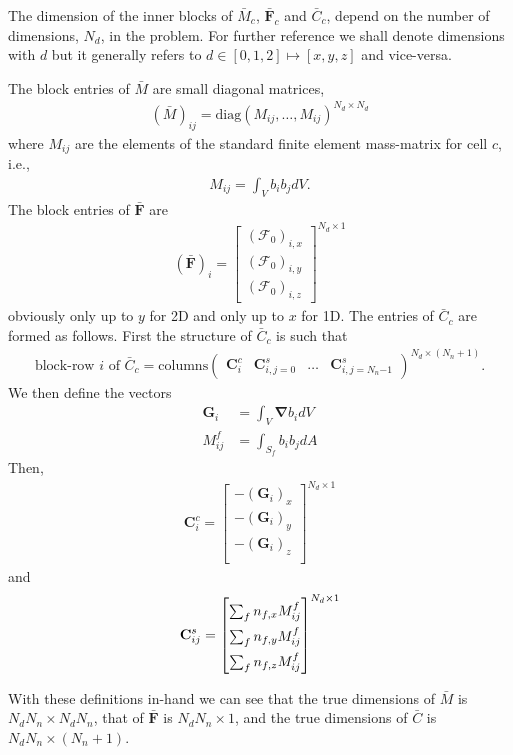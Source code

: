 \documentclass[10pt,letterpaper,notitlepage]{article}
\numberwithin{equation}{section}
\newcommand{\bnabla}{\boldsymbol{\nabla}}
\newcommand{\RadF}{\boldsymbol{\mathcal{F}}}
\newcommand{\RadJ}{\RadF_0}
\newcommand{\beqn}{\begin{equation}\begin{aligned}}
\newcommand{\eeqn}{\end{aligned}\end{equation}}
\begin{document}
 The dimension of the inner blocks of $\bar{M}_c$, $\bar{\mathbf{F}}_c$ and $\bar{C}_c$, depend on the number of dimensions, $N_d$, in the problem. For further reference we shall denote dimensions with $d$ but it generally refers to $d\in[0,1,2] \mapsto [x,y,z]$ and vice-versa. 
 
 The block entries of $\bar{M}$ are small diagonal matrices,
 \beqn 
(\bar{M})_{ij} = \text{diag}(M_{ij}, \dots,  M_{ij})^{N_d{\times}N_d}
 \eeqn 
 where $M_{ij}$ are the elements of the standard finite element mass-matrix for cell $c$, i.e.,
 \beqn 
 M_{ij} = \int_V b_i b_j dV.
 \eeqn 
The block entries of $\bar{\mathbf{F}}$ are
\beqn 
(\bar{\mathbf{F}})_i = 
\begin{bmatrix}
	(\RadJ)_{i,x} \\ 	(\RadJ)_{i,y} \\ 	(\RadJ)_{i,z}
\end{bmatrix}^{N_d{\times}1}
\eeqn 
obviously only up to $y$ for 2D and only up to $x$ for 1D.
The entries of $\bar{C}_c$ are formed as follows. First the structure of $\bar{C}_c$ is such that
\beqn 
\text{block-row }i\text{ of }
\bar{C}_c =
\text{columns}
\begin{pmatrix}
	\mathbf{C}_{i}^c & \mathbf{C}_{i,j=0}^s & \dots & \mathbf{C}_{i,j=N_n{-1}}^s
\end{pmatrix}^{N_d{\times}(N_n + 1)}.
\eeqn 
We then define the vectors
\beqn 
\mathbf{G}_i &= \int_V \bnabla b_i dV \\
M_{ij}^f &= \int_{S_f}  b_i b_j dA
\eeqn 
Then, 
\beqn 
\mathbf{C}_{i}^c =\begin{bmatrix}
-(\mathbf{G}_i)_x \\
-(\mathbf{G}_i)_y \\
-(\mathbf{G}_i)_z \\
\end{bmatrix}^{N_d{\times}1}
\eeqn 
and 
\beqn 
	\renewcommand*{\arraystretch}{1.5}
\mathbf{C}_{ij}^s = \begin{bmatrix}

\sum_f n_{f,x} M_{ij}^f \\
\sum_f n_{f,y} M_{ij}^f \\
\sum_f n_{f,z} M_{ij}^f
\end{bmatrix}^{N_d{\times}1}
\eeqn 

With these definitions in-hand we can see that the true dimensions of $\bar{M}$ is $N_d N_n {\times} N_d N_n$, that of $\bar{\mathbf{F}}$ is $N_d N_n {\times}1$, and the true dimensions of $\bar{C}$ is $N_d N_n {\times} (N_n+1)$. 
\end{document}
